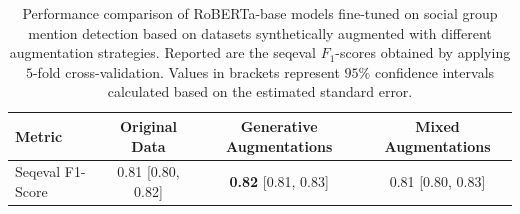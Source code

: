 \begin{table}[htbp]
\centering
\begin{tabular}{lccc}
\toprule
Metric & Original Data & Generative Augmentations & Mixed Augmentations \\
\midrule
Seqeval F1-Score & 0.81 [0.80, 0.82] & \textbf{0.82} [0.81, 0.83] & 0.81 [0.80, 0.83]     \\
\bottomrule
\end{tabular}
\caption[Comparison of augmentation strategies for social group mention detection]{Performance comparison of RoBERTa-base models fine-tuned on social group mention detection based on datasets synthetically augmented with different augmentation strategies. Reported are the seqeval $F_1$-scores obtained by applying $5$-fold cross-validation. Values in brackets represent $95\%$ confidence intervals calculated based on the estimated standard error.}
\label{tab:augmentations_group_detection}
\end{table}